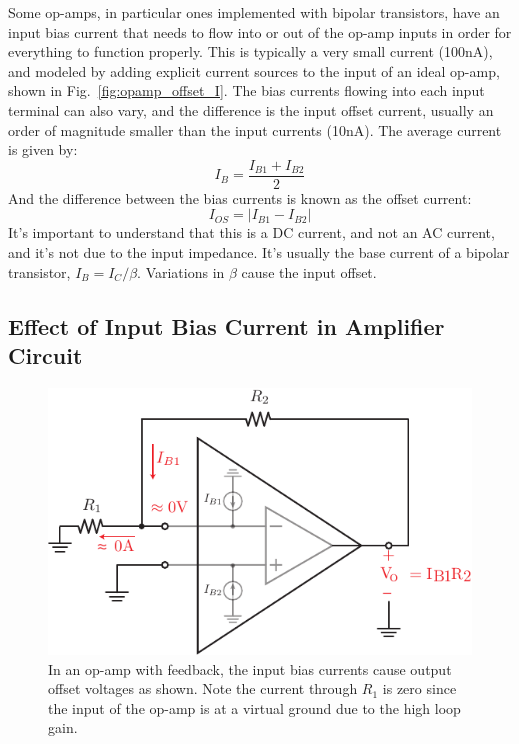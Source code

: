 Some op-amps, in particular ones implemented with bipolar transistors, have an input bias current that needs to flow into or out of the op-amp inputs in order for everything to function properly. This is typically a very small current (100nA), and modeled by adding explicit current sources to the input of an ideal op-amp, shown in Fig.~\ref{fig:opamp_offset_I}.  The bias currents flowing into each input terminal can also vary, and the difference is the input offset current, usually an order of magnitude smaller than the input currents (10nA).  The average current is given by:
\begin{equation}
       I_B = \frac{I_{B1}+I_{B2}}{2}
\end{equation}
And the difference between the bias currents is known as the offset current:
\begin{equation}
        I_{OS} = |I_{B1} - I_{B2} |
\end{equation}
It's important to understand that this is a DC current, and not an AC current, and it's not due to the input impedance.  It's usually the base current of a bipolar transistor, $I_B = I_C/\beta$.  Variations in $\beta$ cause the input offset.
\subsection{Effect of Input Bias Current in Amplifier Circuit}
\begin{figure}[tb]
\begin{center}
\includegraphics[scale=1]{opamp_offset_i2v}
\end{center}
\caption{In an op-amp with feedback, the input bias currents cause output offset voltages as shown.  Note the current through $R_1$ is zero since the input of the op-amp is at a virtual ground due to the high loop gain.}
\label{fig:opamp_offset_i2v}
\end{figure}

